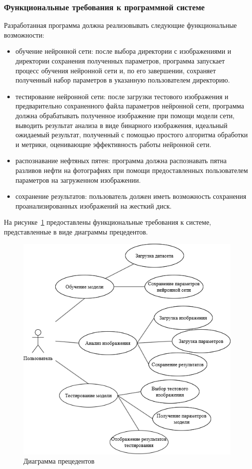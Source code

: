 \subsubsection{Функциональные требования к программной системе}

Разработанная программа должна реализовывать следующие функциональные возможности:

\begin{itemize}
	\item обучение нейронной сети: после выбора директории с изображениями и директории сохранения полученных параметров, программа запускает процесс обучения нейронной сети и, по его завершении, сохраняет полученный набор параметров в указанную пользователем директорию.
	\item тестирование нейронной сети: после загрузки тестового изображения и предварительно сохраненного файла параметров нейронной сети, программа должна обрабатывать полученное изображение при помощи модели сети, выводить результат анализа в виде бинарного изображения, идеальный ожидаемый результат, полученный с помощью простого алгоритма обработки и метрики, оценивающие эффективность работы нейронной сети.
	\item распознавание нефтяных пятен: программа должна распознавать пятна разливов нефти на фотографиях при помощи предоставленных пользователем параметров на загруженном изображении.
	\item сохранение результатов: пользователь должен иметь возможность сохранения проанализированных изображений на жесткий диск.	
\end{itemize}

На рисунке~\ref{fig:usecase} предоставлены функциональные требования к системе, представленные в виде диаграммы прецедентов.

\begin{figure}[H]
	\centering
	\includegraphics[width=1\linewidth]{"images/сценарии использования"}
	\caption{Диаграмма прецедентов}
	\label{fig:usecase}
\end{figure}

